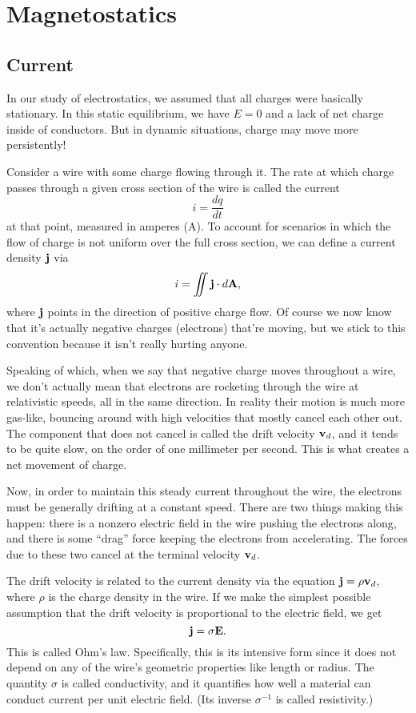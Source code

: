 \documentclass[../p051main.tex]{subfiles}
\begin{document}
\chapter{Magnetostatics}
\section{Current}
In our study of electrostatics, we assumed that all charges were basically stationary.
In this static equilibrium, we have $E = 0$ and a lack of net charge inside of conductors.
But in dynamic situations, charge may move more persistently!

Consider a wire with some charge flowing through it.
The rate at which charge passes through a given cross section of the wire is called the current
\[ i = \frac{dq}{dt} \]
at that point, measured in amperes (A).
To account for scenarios in which the flow of charge is not uniform over the full cross section, we can define a current density $\mathbf{j}$ via
\[ i = \iint \mathbf{j} \cdot d\mathbf{A}, \]
where $\mathbf{j}$ points in the direction of positive charge flow.
Of course we now know that it's actually negative charges (electrons) that're moving, but we stick to this convention because it isn't really hurting anyone.

Speaking of which, when we say that negative charge moves throughout a wire, we don't actually mean that electrons are rocketing through the wire at relativistic speeds, all in the same direction.
In reality their motion is much more gas-like, bouncing around with high velocities that mostly cancel each other out.
The component that does not cancel is called the drift velocity $\mathbf{v}_d$, and it tends to be quite slow, on the order of one millimeter per second.
This is what creates a net movement of charge.

Now, in order to maintain this steady current throughout the wire, the electrons must be generally drifting at a constant speed.
There are two things making this happen: there is a nonzero electric field in the wire pushing the electrons along, and there is some ``drag'' force keeping the electrons from accelerating.
The forces due to these two cancel at the terminal velocity $\mathbf{v}_d$.

The drift velocity is related to the current density via the equation $\mathbf{j} = \rho \mathbf{v}_d$, where $\rho$ is the charge density in the wire.
If we make the simplest possible assumption that the drift velocity is proportional to the electric field, we get
\[ \mathbf{j} = \sigma \mathbf{E}. \]
This is called Ohm's law.
Specifically, this is its intensive form since it does not depend on any of the wire's geometric properties like length or radius.
The quantity $\sigma$ is called conductivity, and it quantifies how well a material can conduct current per unit electric field.
(Its inverse $\sigma^{-1}$ is called resistivity.)
\end{document}
